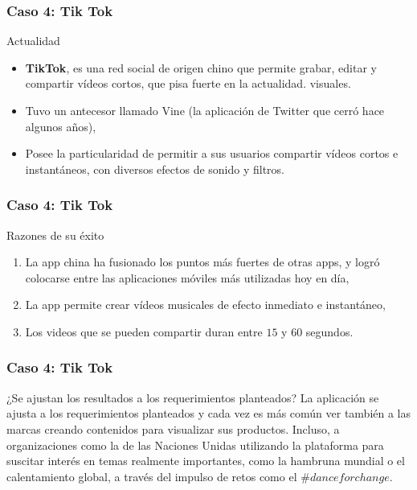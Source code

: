 \documentclass[11pt]{beamer}
\begin{document}
    \begin{frame}
    	\frametitle{Caso 4: Tik Tok}
    	\begin{block}{Actualidad}
    		\begin{itemize}
    			\item \textbf{TikTok}, es una red social de origen chino que permite grabar, editar y compartir vídeos cortos, que pisa fuerte en la actualidad. visuales.
    			\item  Tuvo un antecesor llamado Vine (la aplicación de Twitter que cerró hace algunos años),
    			\item Posee la particularidad de permitir a sus usuarios compartir vídeos cortos e instantáneos, con diversos efectos de sonido y filtros.
    		\end{itemize}
    	\end{block}
    \end{frame}
    
    \begin{frame}
    	\frametitle{Caso 4: Tik Tok}
        \begin{block}{Razones de su éxito}
        	\begin{enumerate}
        		\item La app china ha fusionado los puntos más fuertes de otras apps, y logró colocarse entre las aplicaciones móviles más utilizadas hoy en día,
        		\pause
        		\item La app permite crear vídeos musicales de efecto inmediato e instantáneo,
        		\pause
        		\item Los videos que se pueden compartir duran entre $15$ y $60$ segundos. 
        	\end{enumerate}
        \end{block}
    \end{frame}

    \begin{frame}
   	    \frametitle{Caso 4: Tik Tok}
   	    \begin{block}{¿Se ajustan los resultados a los requerimientos planteados?}
   	    	La aplicación se ajusta a los requerimientos planteados y cada vez es más común ver también a las marcas creando contenidos para visualizar sus productos. Incluso, a organizaciones como la de las Naciones Unidas utilizando la plataforma para suscitar interés en temas realmente importantes, como la hambruna mundial o el calentamiento global, a través del impulso de retos como el $\#danceforchange.$
   	    \end{block}
    \end{frame}
    
\end{document}
